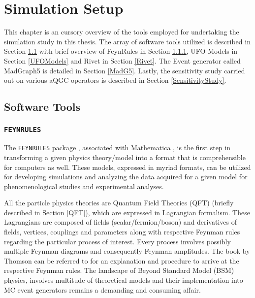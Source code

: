 %
\chapter{Simulation Setup}\label{Ch3}

This chapter is an cursory overview of the tools employed for undertaking the simulation study in this thesis. The  array of software tools utilized is described in Section \ref{SoftwareTools} with brief overview of FeynRules in Section \ref{FeynRulesPackage}, UFO Models in Section \ref{UFOModels} and Rivet in Section \ref{Rivet}. The Event generator called MadGraph5 is detailed in Section \ref{MadG5}. Lastly, the sensitivity study carried out on various aQGC operators is described in Section \ref{SensitivityStudy}. 
\section{Software Tools}\label{SoftwareTools}

\subsection{\texttt{{\Large F}EYN{\Large R}ULES}}\label{FeynRulesPackage}

The \texttt{{\Large F}EYN{\Large R}ULES} package \cite{FeynRules2.0}, \cite{FeynRules-Talk} associated with Mathematica \cite{Mathematica}, is the first step in transforming a given physics theory/model into a format that is comprehensible for computers as well. These models, expressed in myriad formats, can be utilized for developing simulations and analyzing the data acquired for a given model for phenomenological studies and experimental analyses. 

All the particle physics theories are Quantum Field Theories (QFT) (briefly described in Section \ref{QFT}), which are expressed in Lagrangian formalism. These Lagrangians are composed of fields (scalar/fermion/boson) and derivatives of fields, vertices, couplings and parameters along with respective Feynman rules regarding the particular process of interest. Every process involves possibly multiple Feynman diagrams and consequently Feynman amplitudes. The book by Thomson \cite{Thomson} can be referred to for an explanation and procedure to arrive at the respective Feynman rules. The landscape of Beyond Standard Model (BSM) physics, involves multitude of theoretical models and their implementation into MC event generators remains a demanding and consuming affair. %


